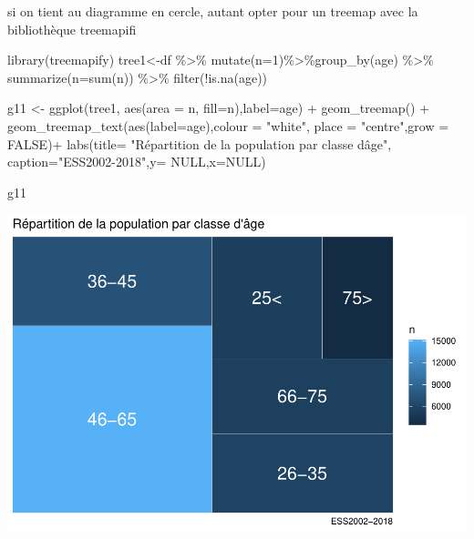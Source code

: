 \documentclass[
]{book}
\newenvironment{Shaded}{\begin{snugshade}}{\end{snugshade}}
\newcommand{\AttributeTok}[1]{\textcolor[rgb]{0.77,0.63,0.00}{#1}}
\newcommand{\ConstantTok}[1]{\textcolor[rgb]{0.00,0.00,0.00}{#1}}
\newcommand{\DecValTok}[1]{\textcolor[rgb]{0.00,0.00,0.81}{#1}}
\newcommand{\FunctionTok}[1]{\textcolor[rgb]{0.00,0.00,0.00}{#1}}
\newcommand{\NormalTok}[1]{#1}
\newcommand{\OtherTok}[1]{\textcolor[rgb]{0.56,0.35,0.01}{#1}}
\newcommand{\SpecialCharTok}[1]{\textcolor[rgb]{0.00,0.00,0.00}{#1}}
\newcommand{\StringTok}[1]{\textcolor[rgb]{0.31,0.60,0.02}{#1}}
\begin{document}
si on tient au diagramme en cercle, autant opter pour un treemap avec la bibliothèque treemapifi

\begin{Shaded}
\begin{Highlighting}[]
\FunctionTok{library}\NormalTok{(treemapify)}
\NormalTok{tree1}\OtherTok{\textless{}{-}}\NormalTok{df }\SpecialCharTok{\%\textgreater{}\%} 
  \FunctionTok{mutate}\NormalTok{(}\AttributeTok{n=}\DecValTok{1}\NormalTok{)}\SpecialCharTok{\%\textgreater{}\%}\FunctionTok{group\_by}\NormalTok{(age) }\SpecialCharTok{\%\textgreater{}\%} 
  \FunctionTok{summarize}\NormalTok{(}\AttributeTok{n=}\FunctionTok{sum}\NormalTok{(n)) }\SpecialCharTok{\%\textgreater{}\%}
  \FunctionTok{filter}\NormalTok{(}\SpecialCharTok{!}\FunctionTok{is.na}\NormalTok{(age))}

\NormalTok{g11 }\OtherTok{\textless{}{-}} \FunctionTok{ggplot}\NormalTok{(tree1, }\FunctionTok{aes}\NormalTok{(}\AttributeTok{area =}\NormalTok{ n, }\AttributeTok{fill=}\NormalTok{n),}\AttributeTok{label=}\NormalTok{age) }\SpecialCharTok{+}
  \FunctionTok{geom\_treemap}\NormalTok{() }\SpecialCharTok{+}
  \FunctionTok{geom\_treemap\_text}\NormalTok{(}\FunctionTok{aes}\NormalTok{(}\AttributeTok{label=}\NormalTok{age),}\AttributeTok{colour =} \StringTok{"white"}\NormalTok{, }\AttributeTok{place =} \StringTok{"centre"}\NormalTok{,}\AttributeTok{grow =} \ConstantTok{FALSE}\NormalTok{)}\SpecialCharTok{+}
  \FunctionTok{labs}\NormalTok{(}\AttributeTok{title=} \StringTok{"Répartition de la population par classe d\textquotesingle{}âge"}\NormalTok{, }\AttributeTok{caption=}\StringTok{"ESS2002{-}2018"}\NormalTok{,}\AttributeTok{y=} \ConstantTok{NULL}\NormalTok{,}\AttributeTok{x=}\ConstantTok{NULL}\NormalTok{) }

\NormalTok{g11}
\end{Highlighting}
\end{Shaded}

\includegraphics{bookdown-demo_files/figure-latex/311-1.pdf}
\end{document}

